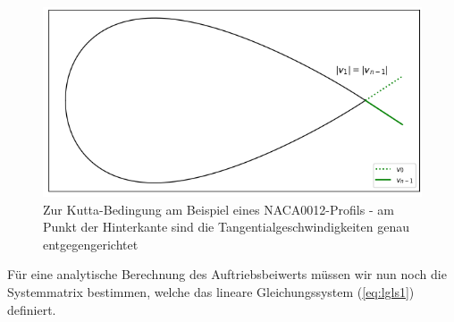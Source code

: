 \begin{figure}
\begin{center} \includegraphics[scale=0.7]{figures/kutta.png} \end{center}
\caption{Zur Kutta-Bedingung am Beispiel eines NACA0012-Profils - am Punkt der Hinterkante sind die Tangentialgeschwindigkeiten genau entgegengerichtet}
\label{fig:kutta}
\end{figure}
Für eine analytische Berechnung des Auftriebsbeiwerts müssen wir nun noch die Systemmatrix bestimmen, welche das lineare Gleichungssystem (\eqref{eq:lgls1}) definiert. \cite{Hess:1966} \cite{Cebeci:1999} \cite{Alonso:2005}

